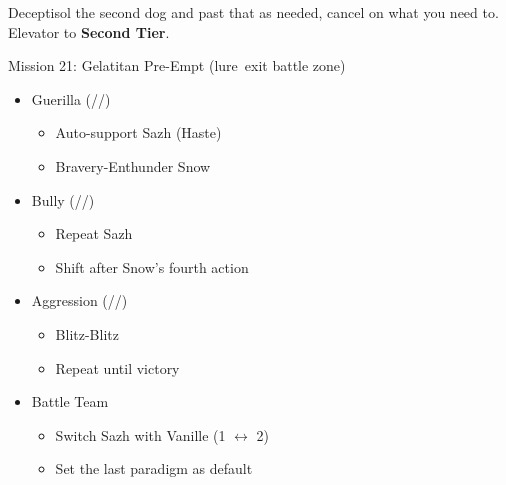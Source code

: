 \renewcommand{\first}{[1] Guerilla (\syn/\sab/\rav)}
\renewcommand{\second}{[2] Tireless Charge (\com/\med/\com)}
\renewcommand{\third}{[3] Hero's Charge (\syn/\med/\com)}
\renewcommand{\fourth}{[4] Devastation (\com/\sab/\com)}
\renewcommand{\fifth}{[5] Bully (\syn/\sab/\com)}
\renewcommand{\sixth}{[6] Aggression (\com/\rav/\com)}
\begin{multicols}{2}

Deceptisol the second dog and past that as needed, cancel on what you need to.
Elevator to \textbf{Second Tier}.
\begin{battle}{Mission 21: Gelatitan Pre-Empt (lure\, exit battle zone)}
\begin{itemize}
    \item \first
    \begin{itemize}
        \item Auto-support Sazh (Haste)
        \item Bravery-Enthunder Snow
    \end{itemize}
    \item \fifth
    \begin{itemize}
        \item Repeat Sazh
        \item Shift after Snow's fourth action
    \end{itemize}
    \item \sixth
    \begin{itemize}
        \item Blitz-Blitz
        \item Repeat until victory
    \end{itemize}
\end{itemize}
\end{battle}
\begin{menu}
\begin{itemize}
    \paradigm
    \begin{itemize}
        \item Battle Team
        \begin{itemize}
            \item Switch Sazh with Vanille (1 $\leftrightarrow$ 2)
            \item Set the last paradigm as default
        \end{itemize}
    \end{itemize}
\end{itemize}
\end{menu}
\vfill
\renewcommand{\sixth}{[6] Aggression (\rav/\com/\com)}

\end{multicols}
